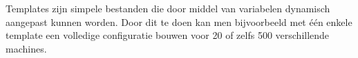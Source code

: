 
Templates zijn simpele bestanden die door middel van variabelen dynamisch aangepast kunnen worden.
Door dit te doen kan men bijvoorbeeld met één enkele template een volledige configuratie bouwen voor 20 of zelfs 500 verschillende machines.
